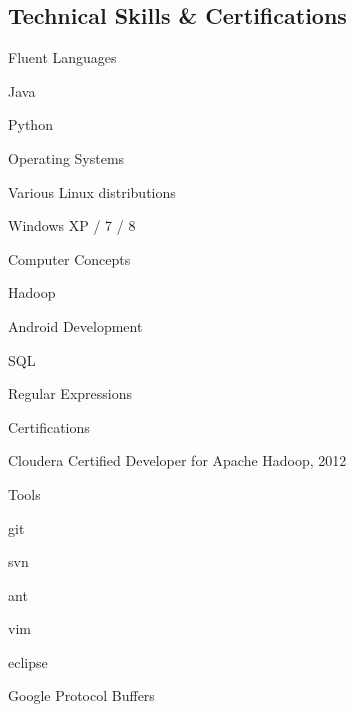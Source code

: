 \documentclass[a4paper,margin,line,11pt]{resume}
\begin{document}
\begin{resume}
\section{\mysidestyle Technical Skills \& Certifications}
	\begin{compactdesc}
		\item[Fluent Languages] \begin{inparaenum} { \small
			\item Java
			\item Python
		} \end{inparaenum}
		\item[Operating Systems] \begin{inparaenum} { \small
			\item Various Linux distributions
			\item Windows XP / 7 / 8
		} \end{inparaenum}
		\item[Computer Concepts] \begin{inparaenum} { \small
			\item Hadoop
			\item Android Development
			\item SQL
			\item Regular Expressions
		} \end{inparaenum}
		\item[Certifications] \begin{inparaenum} { \small
		    \item Cloudera Certified Developer for Apache Hadoop, 2012
		} \end{inparaenum}
        \item[Tools] \begin{inparaenum} { \small
            \item git
            \item svn
            \item ant
            \item vim
            \item eclipse
            \item Google Protocol Buffers
        } \end{inparaenum}
	\end{compactdesc}


\end{resume}
\end{document}
